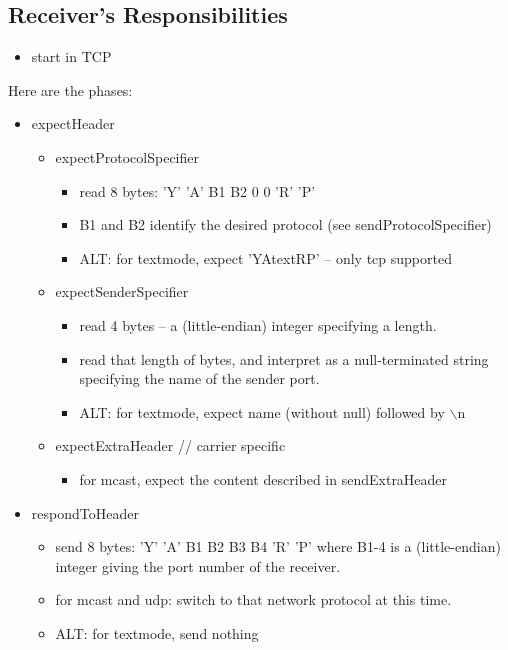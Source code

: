 \documentclass[a4]{article}
\begin{document}
\subsection{Receiver's Responsibilities}


\begin{itemize}
\item  start in TCP
\end{itemize}

Here are the phases:


\begin{itemize}
\item expectHeader
  
  \begin{itemize}
  \item expectProtocolSpecifier
    \begin{itemize}
    \item read 8 bytes: 'Y' 'A' B1 B2 0 0 'R' 'P'
    \item B1 and B2 identify the desired protocol (see sendProtocolSpecifier)
    \item ALT: for textmode, expect 'YAtextRP' -- only tcp supported
    \end{itemize}

  \item expectSenderSpecifier
    \begin{itemize}
    \item read 4 bytes -- a (little-endian) integer specifying a length.
    \item read that length of bytes, and interpret as a null-terminated
      string specifying the name of the sender port.
    \item ALT: for textmode, expect name (without null) followed by $\backslash$n
    \end{itemize}

  \item expectExtraHeader        // carrier specific
    \begin{itemize}
    \item for mcast, expect the content described in sendExtraHeader
    \end{itemize}
  \end{itemize}

\item respondToHeader
  \begin{itemize}
  \item send 8 bytes: 'Y' 'A' B1 B2 B3 B4 'R' 'P' where B1-4 is a 
    (little-endian) integer giving the port number of the receiver.
  \item for mcast and udp: switch to that network protocol at this time.
  \item ALT: for textmode, send nothing
  \end{itemize}


\end{itemize}
\end{document}
